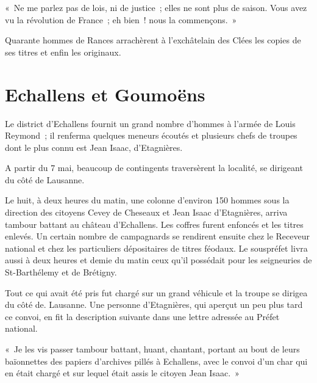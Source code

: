 \documentclass[french,twoside]{book} %
\newenvironment{quoteblock}%
  {\begin{quoting}}
  {\end{quoting}}
\newenvironment{quotebar}{%
    \def\FrameCommand{{\color{rubric!10!}\vrule width 0.5em} \hspace{0.9em}}%
    \def\OuterFrameSep{\itemsep} %
    \MakeFramed {\advance\hsize-\width \FrameRestore}
  }%
  {%
    \endMakeFramed
  }
\renewenvironment{quoteblock}%
  {%
    \savenotes
    \setstretch{0.9}
    \normalfont
    \begin{quotebar}
  }
  {%
    \end{quotebar}
    \spewnotes
  }
\begin{document}
\begin{quoteblock}
 \noindent « Ne me parlez pas de lois, ni de justice ; elles ne sont plus de saison. Vous avez vu la révolution de France ; eh bien ! nous la commençons. »
 \end{quoteblock}

\noindent Quarante hommes de Rances arrachèrent à l’exchâtelain des Clées les copies de ses titres et enfin les originaux.
\section[Echallens et Goumoëns]{Echallens et Goumoëns}
\noindent Le district d’Echallens fournit un grand nombre d’hommes à l’armée de Louis Reymond ; il renferma quelques meneurs écoutés et plusieurs chefs de troupes dont le plus connu est Jean Isaac, d’Etagnières.\par
A partir du 7 mai, beaucoup de contingents traversèrent la localité, se dirigeant du côté de Lausanne.\par
Le huit, à deux heures du matin, une colonne d’environ 150 hommes sous la direction des citoyens Cevey de Cheseaux et Jean Isaac d’Etagnières, arriva tambour battant au château d’Echallens. Les coffres furent enfoncés et les titres enlevés. Un certain nombre de campagnards se rendirent ensuite chez le Receveur national et chez les particuliers dépositaires de titres féodaux. Le souspréfet livra aussi à deux heures et demie du matin ceux qu’il possédait pour les seigneuries de St-Barthélemy et de Brétigny.\par
Tout ce qui avait été pris fut chargé sur un grand véhicule et la troupe se dirigea du côté de. Lausanne. Une personne d’Etagnières, qui aperçut un peu plus tard ce convoi, en fit la description suivante dans une lettre adressée au Préfet national.\par

\begin{quoteblock}
 \noindent « Je les vis passer tambour battant, huant, chantant, portant au bout de leurs baïonnettes des papiers d’archives pillés à Echallens, avec le convoi d’un char qui en était chargé et sur lequel était assis le citoyen Jean Isaac. »
 \end{quoteblock}
\end{document}
